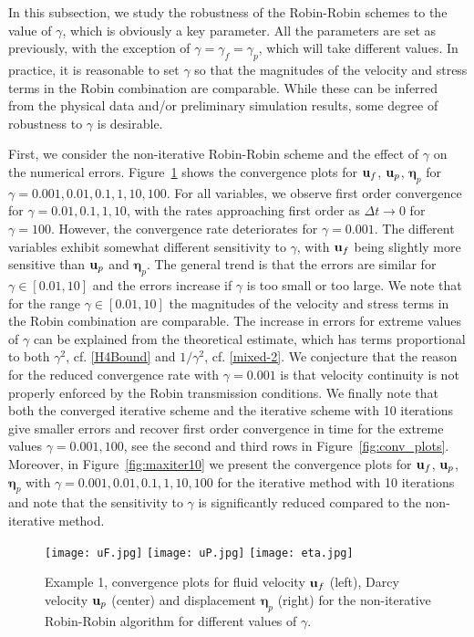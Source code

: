 \documentclass[11pt]{article}
\def\u{{\bf u}}
\def\bbeta{\boldsymbol{\eta}}
\begin{document}
In this subsection, we study the robustness of the Robin-Robin schemes to the
value of $\gamma$, which is obviously a key parameter. All the parameters are set as previously, with the exception of $\gamma = \gamma_f = \gamma_p$, which will take different values. In practice, it is reasonable to set $\gamma$ so that the magnitudes of the velocity and stress terms in the Robin combination are comparable. While these can be inferred from the physical data and/or preliminary simulation results, some degree of robustness to $\gamma$ is desirable. 

First, we consider the non-iterative Robin-Robin scheme and the effect of $\gamma$ on the numerical errors. Figure~\ref{fig:conv_plots-gamma} shows the convergence plots for $\u_f$, $\u_p$, $\bbeta_p$ for $\gamma = 0.001, 0.01, 0.1, 1, 10, 100$. For all variables, we observe first order convergence for $\gamma = 0.01, 0.1, 1, 10$, with the rates approaching first order as $\Delta t \to 0$ for $\gamma = 100$. However, the convergence rate deteriorates for $\gamma = 0.001$. The different variables exhibit somewhat different sensitivity to $\gamma$, with $\u_f$ being slightly more sensitive than $\u_p$ and $\bbeta_p$. The general trend is that the errors are similar for $\gamma \in [0.01,10]$ and the errors increase if $\gamma$ is too small or too large. We note that for the range $\gamma \in [0.01,10]$ the magnitudes of the velocity and stress terms in the Robin combination are comparable. The increase in errors for extreme values of $\gamma$ can be explained from the theoretical estimate, which has terms proportional to both $\gamma^2$, cf. \eqref{H4Bound} and $1/\gamma^2$, cf. \eqref{mixed-2}. We conjecture that the reason for the reduced convergence rate with $\gamma = 0.001$ is that velocity continuity is not properly enforced by the Robin transmission conditions. We finally note that both the converged iterative scheme and the iterative scheme with 10 iterations give smaller errors and recover first order convergence in time for the extreme values $\gamma = 0.001, 100$, see the second and third rows in Figure~\ref{fig:conv_plots}.
Moreover, in Figure~\ref{fig:maxiter10} we present the convergence plots for $\u_f$, $\u_p$, $\bbeta_p$ with $\gamma = 0.001, 0.01, 0.1, 1, 10, 100$ for the iterative method with 10 iterations and note that the sensitivity to $\gamma$ is significantly reduced compared to the non-iterative method.

\begin{figure}[ht!]
\begin{center}
\texttt{[image: uF.jpg]}
\texttt{[image: uP.jpg]}
\texttt{[image: eta.jpg]}
\end{center}
\caption{Example 1, convergence plots for fluid velocity $\u_f$ (left), Darcy velocity $\u_p$ (center) and displacement $\bbeta_p$ (right) for the non-iterative Robin-Robin algorithm for different values of $\gamma$.}\label{fig:conv_plots-gamma}
\end{figure}
\end{document}
